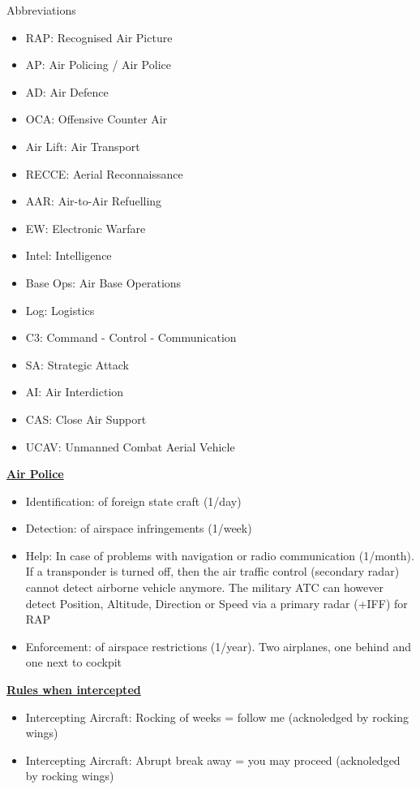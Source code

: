 \documentclass[9pt, landscape, fleqn]{scrartcl}
\begin{document}
\begin{multicols*}{3}
\begin{center}
\end{center} 
Abbreviations
\begin{itemize}
    \item RAP: Recognised Air Picture
    \item AP: Air Policing / Air Police
    \item AD: Air Defence 
    \item OCA: Offensive Counter Air 
    \item Air Lift: Air Transport 
    \item RECCE: Aerial Reconnaissance
    \item AAR: Air-to-Air Refuelling
    \item EW: Electronic Warfare 
    \item Intel: Intelligence 
    \item Base Ops: Air Base Operations 
    \item Log: Logistics 
    \item C3: Command - Control - Communication 
    \item SA: Strategic Attack 
    \item AI: Air Interdiction 
    \item CAS: Close Air Support 
    \item UCAV: Unmanned Combat Aerial Vehicle
\end{itemize}
\underline{\textbf{Air Police}}
\begin{itemize}
    \item Identification: of foreign state craft (1/day)
    \item Detection: of airspace infringements (1/week)
    \item Help: In case of problems with navigation or radio communication (1/month). If a transponder is turned off, then the air traffic control (secondary radar) cannot detect airborne vehicle anymore. The military ATC can however detect Position, Altitude, Direction or Speed via a primary radar (+IFF) for RAP
    \item Enforcement: of airspace restrictions (1/year). Two airplanes, one behind and one next to cockpit 
\end{itemize}
\underline{\textbf{Rules when intercepted}}
\begin{itemize}
    \item Intercepting Aircraft: Rocking of weeks = follow me (acknoledged by rocking wings)
    \item Intercepting Aircraft: Abrupt break away = you may proceed (acknoledged by rocking wings)

\end{itemize}
\end{multicols*}
\end{document}
